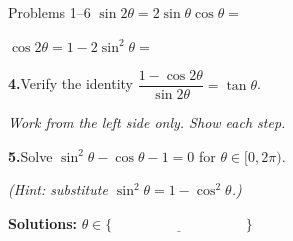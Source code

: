 \documentclass[10pt]{article}
\begin{document}
\begin{notesbox}{Problems 1--6}
\vspace{4pt}
$\sin 2\theta = 2\sin\theta\cos\theta = $ \underline{\hspace{4.5cm}}

\vspace{4pt}
$\cos 2\theta = 1 - 2\sin^2\theta = $ \underline{\hspace{4.5cm}}

\vspace{0.14in}
\textbf{4.}\quad Verify the identity $\dfrac{1 - \cos 2\theta}{\sin 2\theta} = \tan\theta$.

\textit{Work from the left side only. Show each step.}


\vspace{0.14in}
\textbf{5.}\quad Solve $\sin^2\theta - \cos\theta - 1 = 0$ for $\theta \in [0, 2\pi)$.

\textit{(Hint: substitute $\sin^2\theta = 1 - \cos^2\theta$.)}


\textbf{Solutions:} $\theta \in \big\{ \underline{\hspace{4cm}} \big\}$

\end{notesbox}

\vspace{0.08in}
\end{document}
